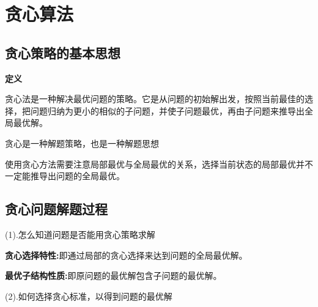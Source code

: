\section{贪心算法}

\subsection{贪心策略的基本思想}

\textbf{定义}

贪心法是一种解决最优问题的策略。它是从问题的初始解出发，按照当前最佳的选择，把问题归纳为更小的相似的子问题，并使子问题最优，再由子问题来推导出全局最优解。


贪心是一种解题策略，也是一种解题思想


使用贪心方法需要注意局部最优与全局最优的关系，选择当前状态的局部最优并不一定能推导出问题的全局最优。


\subsection{贪心问题解题过程}

(1).怎么知道问题是否能用贪心策略求解

\textbf{贪心选择特性:}即通过局部的贪心选择来达到问题的全局最优解。

\textbf{最优子结构性质:}即原问题的最优解包含子问题的最优解。

(2).如何选择贪心标准，以得到问题的最优解